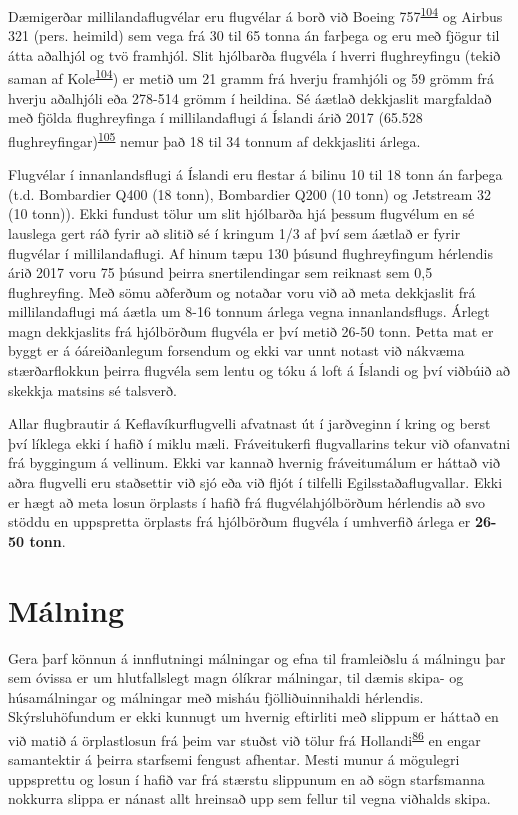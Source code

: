 \documentclass[icelandic,]{book}
\begin{document}
Dæmigerðar millilandaflugvélar eru flugvélar á borð við Boeing 757\textsuperscript{\protect\hyperlink{ref-kole2017wear}{104}} og Airbus 321 (pers. heimild) sem vega frá 30 til 65 tonna án farþega og eru með fjögur til átta aðalhjól og tvö framhjól. Slit hjólbarða flugvéla í hverri flughreyfingu (tekið saman af Kole\textsuperscript{\protect\hyperlink{ref-kole2017wear}{104}}) er metið um 21 gramm frá hverju framhjóli og 59 grömm frá hverju aðalhjóli eða 278-514 grömm í heildina. Sé áætlað dekkjaslit margfaldað með fjölda flughreyfinga í millilandaflugi á Íslandi árið 2017 (65.528 flughreyfingar)\textsuperscript{\protect\hyperlink{ref-isavia2017}{105}} nemur það 18 til 34 tonnum af dekkjasliti árlega.

Flugvélar í innanlandsflugi á Íslandi eru flestar á bilinu 10 til 18 tonn án farþega (t.d. Bombardier Q400 (18 tonn), Bombardier Q200 (10 tonn) og Jetstream 32 (10 tonn)). Ekki fundust tölur um slit hjólbarða hjá þessum flugvélum en sé lauslega gert ráð fyrir að slitið sé í kringum 1/3 af því sem áætlað er fyrir flugvélar í millilandaflugi. Af hinum tæpu 130 þúsund flughreyfingum hérlendis árið 2017 voru 75 þúsund þeirra snertilendingar sem reiknast sem 0,5 flughreyfing. Með sömu aðferðum og notaðar voru við að meta dekkjaslit frá millilandaflugi má áætla um 8-16 tonnum árlega vegna innanlandsflugs. Árlegt magn dekkjaslits frá hjólbörðum flugvéla er því metið 26-50 tonn. Þetta mat er byggt er á óáreiðanlegum forsendum og ekki var unnt notast við nákvæma stærðarflokkun þeirra flugvéla sem lentu og tóku á loft á Íslandi og því viðbúið að skekkja matsins sé talsverð.

Allar flugbrautir á Keflavíkurflugvelli afvatnast út í jarðveginn í kring og berst því líklega ekki í hafið í miklu mæli. Fráveitukerfi flugvallarins tekur við ofanvatni frá byggingum á vellinum. Ekki var kannað hvernig fráveitumálum er háttað við aðra flugvelli eru staðsettir við sjó eða við fljót í tilfelli Egilsstaðaflugvallar. Ekki er hægt að meta losun örplasts í hafið frá flugvélahjólbörðum hérlendis að svo stöddu en uppspretta örplasts frá hjólbörðum flugvéla í umhverfið árlega er \textbf{26-50 tonn}.

\hypertarget{malning}{%
\section*{Málning}\label{malning}}

Gera þarf könnun á innflutningi málningar og efna til framleiðslu á málningu þar sem óvissa er um hlutfallslegt magn ólíkrar málningar, til dæmis skipa- og húsamálningar og málningar með misháu fjölliðuinnihaldi hérlendis. Skýrsluhöfundum er ekki kunnugt um hvernig eftirliti með slippum er háttað en við matið á örplastlosun frá þeim var stuðst við tölur frá Hollandi\textsuperscript{\protect\hyperlink{ref-Verschoor2016}{86}} en engar samantektir á þeirra starfsemi fengust afhentar. Mesti munur á mögulegri uppsprettu og losun í hafið var frá stærstu slippunum en að sögn starfsmanna nokkurra slippa er nánast allt hreinsað upp sem fellur til vegna viðhalds skipa.
\end{document}
